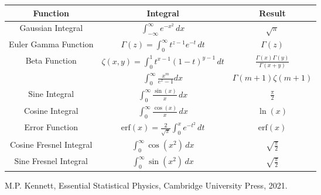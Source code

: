 \documentclass{article}
\begin{document}
\renewcommand{\arraystretch}{1.5}
\begin{center}
    \begin{tabular}{|c|c|c|}
        \hline
        \textbf{Function}       & \textbf{Integral}                                                  & \textbf{Result}                          \\
        \hline
        Gaussian Integral       & $\int_{-\infty}^{\infty} e^{-x^2} \, dx$                           & $\sqrt{\pi}$                             \\
        \hline
        Euler Gamma Function    & $\Gamma(z) = \int_{0}^{\infty} t^{z-1} e^{-t} \, dt$               & $\Gamma(z)$                              \\
        \hline
        Beta Function           & $\zeta(x,y) = \int_{0}^{1} t^{x-1} (1-t)^{y-1} \, dt$              & $\frac{\Gamma(x)\Gamma(y)}{\Gamma(x+y)}$ \\
        \hline
                                & $\int_0^\infty \frac{x^m}{e^x-1}dx$                                & $\Gamma(m+1)\zeta(m+1)$                  \\
        \hline
        Sine Integral           & $\int_{0}^{\infty} \frac{\sin(x)}{x} \, dx$                        & $\frac{\pi}{2}$                          \\
        \hline
        Cosine Integral         & $\int_{0}^{\infty} \frac{\cos(x)}{x} \, dx$                        & $\ln(x)$                                 \\
        \hline
        Error Function          & $\text{erf}(x) = \frac{2}{\sqrt{\pi}} \int_{0}^{x} e^{-t^2} \, dt$ & $\text{erf}(x)$                          \\
        \hline
        Cosine Fresnel Integral & $\int_{0}^{\infty} \cos(x^2) \, dx$                                & $\sqrt{\frac{\pi}{2}}$                   \\
        \hline
        Sine Fresnel Integral   & $\int_{0}^{\infty} \sin(x^2) \, dx$                                & $\sqrt{\frac{\pi}{2}}$                   \\
        \hline
    \end{tabular}
\end{center}

\newpage

\begin{thebibliography}{9}

    M.P. Kennett,
    Essential Statistical Physics,
    Cambridge University Press,
    2021.



\end{thebibliography}
\end{document}
